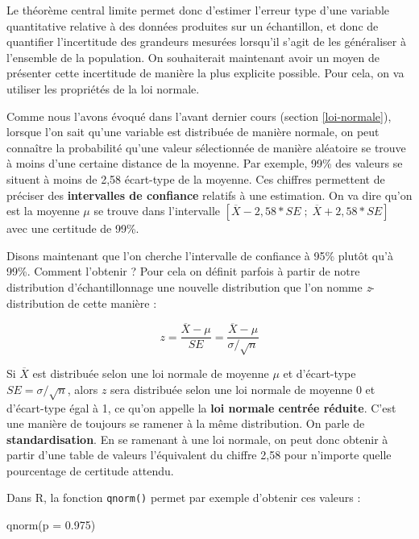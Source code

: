 \documentclass[
]{book}
\newenvironment{Shaded}{\begin{snugshade}}{\end{snugshade}}
\newcommand{\AttributeTok}[1]{\textcolor[rgb]{0.77,0.63,0.00}{#1}}
\newcommand{\FloatTok}[1]{\textcolor[rgb]{0.00,0.00,0.81}{#1}}
\newcommand{\FunctionTok}[1]{\textcolor[rgb]{0.00,0.00,0.00}{#1}}
\newcommand{\NormalTok}[1]{#1}
\begin{document}
Le théorème central limite permet donc d'estimer l'erreur type d'une variable quantitative relative à des données produites sur un échantillon, et donc de quantifier l'incertitude des grandeurs mesurées lorsqu'il s'agit de les généraliser à l'ensemble de la population. On souhaiterait maintenant avoir un moyen de présenter cette incertitude de manière la plus explicite possible. Pour cela, on va utiliser les propriétés de la loi normale.

Comme nous l'avons évoqué dans l'avant dernier cours (section \ref{loi-normale}), lorsque l'on sait qu'une variable est distribuée de manière normale, on peut connaître la probabilité qu'une valeur sélectionnée de manière aléatoire se trouve à moins d'une certaine distance de la moyenne. Par exemple, 99\% des valeurs se situent à moins de 2,58 écart-type de la moyenne. Ces chiffres permettent de préciser des \textbf{intervalles de confiance} relatifs à une estimation. On va dire qu'on est la moyenne \(\mu\) se trouve dans l'intervalle \([\overline{X}-2,58*SE \;;\; \overline{X}+2,58*SE]\) avec une certitude de 99\%.

Disons maintenant que l'on cherche l'intervalle de confiance à 95\% plutôt qu'à 99\%. Comment l'obtenir ? Pour cela on définit parfois à partir de notre distribution d'échantillonnage une nouvelle distribution que l'on nomme \emph{z}-distribution de cette manière :

\[ z = \frac{\overline{X} - \mu}{SE} = \frac{\overline{X} - \mu}{\sigma/\sqrt{n}}\]

Si \(\overline{X}\) est distribuée selon une loi normale de moyenne \(\mu\) et d'écart-type \(SE = \sigma/\sqrt{n}\), alors \(z\) sera distribuée selon une loi normale de moyenne 0 et d'écart-type égal à 1, ce qu'on appelle la \textbf{loi normale centrée réduite}. C'est une manière de toujours se ramener à la même distribution. On parle de \textbf{standardisation}. En se ramenant à une loi normale, on peut donc obtenir à partir d'une table de valeurs l'équivalent du chiffre 2,58 pour n'importe quelle pourcentage de certitude attendu.

Dans R, la fonction \texttt{qnorm()} permet par exemple d'obtenir ces valeurs :

\begin{Shaded}
\begin{Highlighting}[]
\FunctionTok{qnorm}\NormalTok{(}\AttributeTok{p =} \FloatTok{0.975}\NormalTok{)}
\end{Highlighting}
\end{Shaded}
\end{document}
